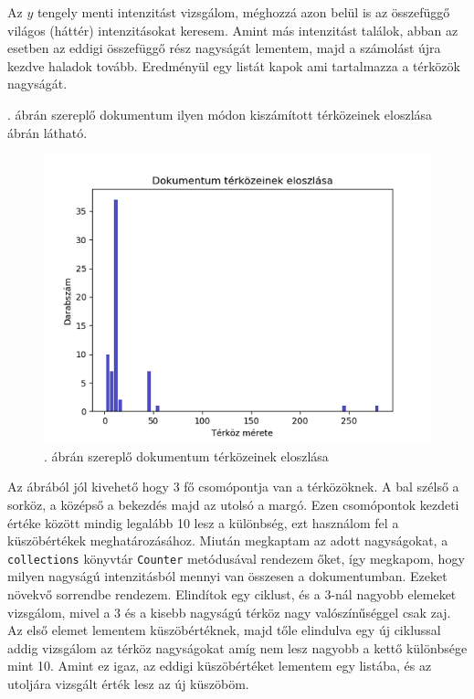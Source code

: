 Az $y$ tengely menti intenzitást vizsgálom, méghozzá azon belül is az összefüggő világos (háttér) intenzitásokat keresem. Amint más intenzitást találok, abban az esetben az eddigi összefüggő rész nagyságát lementem, majd a számolást újra kezdve haladok tovább. Eredményül egy listát kapok ami tartalmazza a térközök nagyságát.

. ábrán szereplő dokumentum ilyen módon kiszámított térközeinek eloszlása  ábrán látható.

\begin{figure}[h!]
\centering
\includegraphics[scale=1]{images/spacing.png}
\caption{. ábrán szereplő dokumentum térközeinek eloszlása}
\label{fig:spacing}
\end{figure}

Az ábrából jól kivehető hogy 3 fő csomópontja van a térközöknek. A bal szélső a sorköz, a középső a bekezdés majd az utolsó a margó. Ezen csomópontok kezdeti értéke között mindig legalább 10 lesz a  különbség, ezt használom fel a küszöbértékek meghatározásához. Miután megkaptam az adott nagyságokat, a \texttt{collections} könyvtár \texttt{Counter} metódusával rendezem őket, így megkapom, hogy milyen nagyságú intenzitásból mennyi van összesen a dokumentumban. Ezeket növekvő sorrendbe rendezem. Elindítok egy ciklust, és a 3-nál nagyobb elemeket vizsgálom, mivel a 3 és a kisebb nagyságú térköz nagy valószínűséggel csak zaj. Az első elemet lementem küszöbértéknek, majd tőle elindulva egy új ciklussal addig vizsgálom az térköz nagyságokat amíg nem lesz nagyobb a kettő különbsége mint 10. Amint ez igaz, az eddigi küszöbértéket lementem egy listába, és az utoljára vizsgált érték lesz az új küszöböm.

